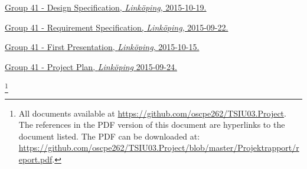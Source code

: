 




\renewcommand*{\refname}{References to the Project Files}
\begin{thebibliography}{99}\label{cha:refs}

  \href{https://github.com/oscpe262/TSIU03.Project/blob/master/Designspec/designspec.pdf}{
    Group 41 - Design Specification,
    \emph{Linköping},
    2015-10-19.
  }

  \href{https://github.com/oscpe262/TSIU03.Project/blob/master/Kravspec/Kravspecifikation.pdf}{
    Group 41 - Requirement Specification,
    \emph{Linköping},
    2015-09-22.
  }
  
  \href{https://github.com/oscpe262/TSIU03.Project/blob/master/Presentationer/firstpres.pdf}{
    Group 41 - First Presentation,
    \emph{Linköping},
    2015-10-15.
  }
  
  \href{https://github.com/oscpe262/TSIU03.Project/blob/master/Projektplan/Project.plan.pdf}{
    Group 41 - Project Plan,
    \emph{Linköping}
    2015-09-24.
  }
  
  
\end{thebibliography}
\let\thefootnote\relax\footnote{All documents available at \url{https://github.com/oscpe262/TSIU03.Project}. The references in the PDF version of this document are hyperlinks to the document listed. The PDF can be downloaded at: \\\url{https://github.com/oscpe262/TSIU03.Project/blob/master/Projektrapport/report.pdf}.}

